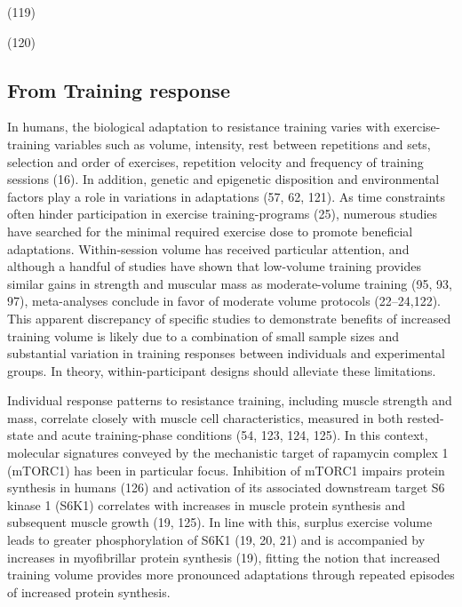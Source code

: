 \documentclass[twoside,10pt]{gihclass} %
\begin{document}
(119)

(120)

\hypertarget{from-training-response}{%
\subsection{From Training response}\label{from-training-response}}

In humans, the biological adaptation to resistance training varies with exercise-training variables such as volume, intensity, rest between repetitions and sets, selection and order of exercises, repetition velocity and frequency of training sessions (16).
In addition, genetic and epigenetic disposition and environmental factors play a role in variations in adaptations
(57, 62, 121).
As time constraints often hinder participation in exercise training-programs (25), numerous studies have searched for the minimal required exercise dose to promote beneficial adaptations. Within-session volume has received particular attention, and although a handful of studies have shown that low-volume training provides similar gains in strength and muscular mass as moderate-volume training
(95, 93, 97), meta-analyses conclude in favor of moderate volume protocols (22--24,122).
This apparent discrepancy of specific studies to demonstrate benefits of increased training volume is likely due to a combination of small sample sizes and substantial variation in training responses between individuals and experimental groups. In theory, within-participant designs should alleviate these limitations.

Individual response patterns to resistance training, including muscle strength and mass, correlate closely with muscle cell characteristics, measured in both rested-state and acute training-phase conditions
(54, 123, 124, 125). {In this context, molecular signatures conveyed by the mechanistic target of rapamycin complex 1 (mTORC1) has been in particular focus. Inhibition of mTORC1 impairs protein synthesis in humans (126) and activation of its associated downstream target S6 kinase 1 (S6K1) correlates with increases in muscle protein synthesis and subsequent muscle growth}
(19, 125).
In line with this, surplus {exercise} volume leads to greater phosphorylation of S6K1
(19, 20, 21) and {is accompanied by increases in }myofibrillar protein synthesis (19),
fitting the notion that increased training volume provides more pronounced adaptations{ through repeated episodes of increased protein synthesis}.
\end{document}
